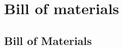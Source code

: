 
\chapter{Bill of materials}

\setcounter{table}{0}
\renewcommand{\thetable}{A\arabic{table}}

\begin{singlespace}
  
\section*{Bill of Materials}
\label{sec:BOM}

\end{singlespace}
